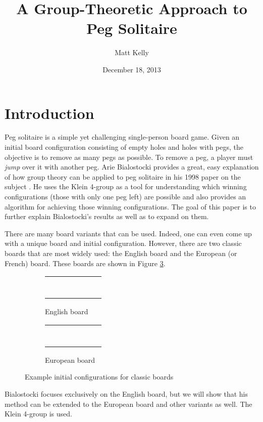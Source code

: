 \documentclass[11pt]{article}
\newcommand*\cir[1]{
  \begin{tikzpicture}[baseline]
    \node[draw,circle,inner sep=0pt,minimum size=12pt,anchor=center](C){#1};
  \end{tikzpicture}}
\newcommand*\h{\cir{}}
\newcommand*\p{
  \begin{tikzpicture}[baseline]
    \node[draw,circle,inner sep=0pt,minimum size=12pt,anchor=center](C){};
    \node[fill=black,circle,inner sep=0pt,minimum size=5pt,anchor=center](C){};
  \end{tikzpicture}}
\newcommand*\englishstart{
\begin{tabular}{m{3pt} m{3pt} m{3pt} m{3pt} m{3pt} m{3pt} m{3pt}}
   &    & \p & \p & \p &    & \\
   &    & \p & \p & \p &    & \\
\p & \p & \p & \p & \p & \p & \p \\
\p & \p & \p & \h & \p & \p & \p \\
\p & \p & \p & \p & \p & \p & \p \\
   &    & \p & \p & \p &    & \\
   &    & \p & \p & \p &    & \\
\end{tabular}}
\newcommand*\europeanstart{
\begin{tabular}{m{3pt} m{3pt} m{3pt} m{3pt} m{3pt} m{3pt} m{3pt}}
   &    & \p & \p & \p &    & \\
   & \p & \p & \p & \p & \p & \\
\p & \p & \p & \p & \p & \p & \p \\
\p & \p & \p & \h & \p & \p & \p \\
\p & \p & \p & \p & \p & \p & \p \\
   & \p & \p & \p & \p & \p & \\
   &    & \p & \p & \p &    & \\
\end{tabular}}
\begin{document}
\title{A Group-Theoretic Approach to Peg Solitaire}
\author{Matt Kelly}
\date{December 18, 2013}

\maketitle

\section{Introduction}
Peg solitaire is a simple yet challenging single-person board game. Given an initial board configuration consisting of empty holes and holes with pegs, the objective is to remove as many pegs as possible. To remove a peg, a player must \emph{jump} over it with another peg. Arie Bialostocki provides a great, easy explanation of how group theory can be applied to peg solitaire in his 1998 paper on the subject \cite{Bialostocki}. He uses the Klein 4-group as a tool for understanding which winning configurations (those with only one peg left) are possible and also provides an algorithm for achieving those winning configurations. The goal of this paper is to further explain Bialostocki's results as well as to expand on them.

There are many board variants that can be used. Indeed, one can even come up with a unique board and initial configuration. However, there are two classic boards that are most widely used: the English board and the European (or French) board. These boards are shown in Figure \ref{fig:classicboards}.

\begin{figure}[h]
\centering
\begin{subfigure}{.5\textwidth}
\centering
\englishstart
\caption{English board}\label{subfig:classicboards:a}
\end{subfigure}%
\begin{subfigure}{.5\textwidth}
\centering
\europeanstart
\caption{European board}\label{subfig:classicboards:b}
\end{subfigure}
\caption{Example initial configurations for classic boards}
\label{fig:classicboards}
\end{figure}

Bialostocki focuses exclusively on the English board, but we will show that his method can be extended to the European board and other variants as well. The Klein 4-group is used.
\end{document}
